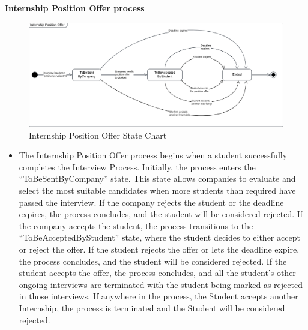 \noindent\textbf{\color{titleColor}Internship Position Offer process}\\
\begin{figure}[H]
    \centering
    \includegraphics[width=1 \textwidth]{Latex/Images/RASD/StateCharts/InternshipPositionOfferStateChart.png}    
    \caption{Internship Position Offer State Chart}
    \label{fig:InternshipPositionOffer}
\end{figure}
\begin{itemize}
    \item The Internship Position Offer process begins when a student successfully completes the Interview Process. Initially, the process enters the “ToBeSentByCompany” state.
    This state allows companies to evaluate and select the most suitable candidates when more students than required have passed the interview.
    If the company rejects the student or the deadline expires, the process concludes, and the student will be considered rejected.
    If the company accepts the student, the process transitions to the “ToBeAcceptedByStudent” state, where the student decides to either accept or reject the offer.
    If the student rejects the offer or lets the deadline expire, the process concludes, and the student will be considered rejected.
    If the student accepts the offer, the process concludes, and all the student’s other ongoing interviews are terminated with the student being marked as rejected in those interviews.
    If anywhere in the process, the Student accepts another Internship, the process is terminated and the Student will be considered rejected.
\end{itemize}

